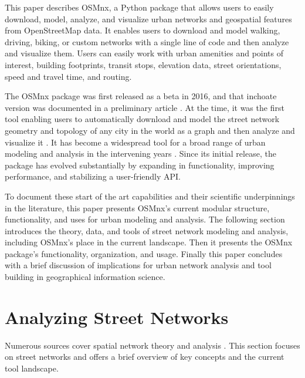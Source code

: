 \documentclass[12pt,letterpaper]{article} %
\begin{document}
This paper describes OSMnx, a Python package that allows users to easily download, model, analyze, and visualize urban networks and geospatial features from OpenStreetMap data. It enables users to download and model walking, driving, biking, or custom networks with a single line of code and then analyze and visualize them. Users can easily work with urban amenities and points of interest, building footprints, transit stops, elevation data, street orientations, speed and travel time, and routing.

The OSMnx package was first released as a beta in 2016, and that inchoate version was documented in a preliminary article \citep{boeing_osmnx:_2017}. At the time, it was the first tool enabling users to automatically download and model the street network geometry and topology of any city in the world as a graph and then analyze and visualize it \citep{boeing_right_2020}. It has become a widespread tool for a broad range of urban modeling and analysis in the intervening years \citep[e.g.,][]{coutrot_cities_2020,dacci_signature_2019,feng_spatial_2020,gervasoni_calculating_2017,liao_disparities_2020,natera_orozco_data-driven_2019,yin_multi-task_2020,young_automatic_2020}. Since its initial release, the package has evolved substantially by expanding in functionality, improving performance, and stabilizing a user-friendly API.\@

To document these start of the art capabilities and their scientific underpinnings in the literature, this paper presents OSMnx's current modular structure, functionality, and uses for urban modeling and analysis. The following section introduces the theory, data, and tools of street network modeling and analysis, including OSMnx's place in the current landscape. Then it presents the OSMnx package's functionality, organization, and usage. Finally this paper concludes with a brief discussion of implications for urban network analysis and tool building in geographical information science.

\section{Analyzing Street Networks}

Numerous sources cover spatial network theory and analysis \citep[e.g.,][]{tinkler_graph_1979,barnes_graph_1983,gastner_spatial_2006,barthelemy_spatial_2011,ducruet_spatial_2014,fischer_spatial_2014,marshall_street_2018}. This section focuses on street networks and offers a brief overview of key concepts and the current tool landscape.
\end{document}
